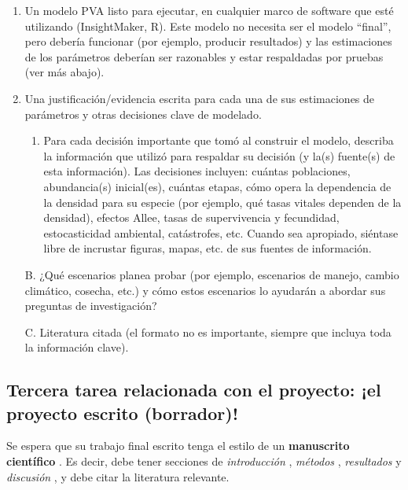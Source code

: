 \documentclass[
]{article}
\providecommand{\tightlist}{%
  \setlength{\itemsep}{0pt}\setlength{\parskip}{0pt}}
\begin{document}
\begin{enumerate}
\def\labelenumi{\arabic{enumi}.}
\item
  Un modelo PVA listo para ejecutar, en cualquier marco de software que
  esté utilizando (InsightMaker, R). Este modelo no necesita ser el
  modelo ``final'', pero debería funcionar (por ejemplo, producir
  resultados) y las estimaciones de los parámetros deberían ser
  razonables y estar respaldadas por pruebas (ver más abajo).
\item
  Una justificación/evidencia escrita para cada una de sus estimaciones
  de parámetros y otras decisiones clave de modelado.

  \begin{enumerate}
  \def\labelenumii{\Alph{enumii}.}
  \tightlist
  \item
    Para cada decisión importante que tomó al construir el modelo,
    describa la información que utilizó para respaldar su decisión (y
    la(s) fuente(s) de esta información). Las decisiones incluyen:
    cuántas poblaciones, abundancia(s) inicial(es), cuántas etapas, cómo
    opera la dependencia de la densidad para su especie (por ejemplo,
    qué tasas vitales dependen de la densidad), efectos Allee, tasas de
    supervivencia y fecundidad, estocasticidad ambiental, catástrofes,
    etc. Cuando sea apropiado, siéntase libre de incrustar figuras,
    mapas, etc. de sus fuentes de información.
  \end{enumerate}

  B. ¿Qué escenarios planea probar (por ejemplo, escenarios de manejo,
  cambio climático, cosecha, etc.) y cómo estos escenarios lo ayudarán a
  abordar sus preguntas de investigación?

  C. Literatura citada (el formato no es importante, siempre que incluya
  toda la información clave).
\end{enumerate}

\hypertarget{tercera-tarea-relacionada-con-el-proyecto-el-proyecto-escrito-borrador}{%
\subsection{Tercera tarea relacionada con el proyecto: ¡el proyecto
escrito
(borrador)!}\label{tercera-tarea-relacionada-con-el-proyecto-el-proyecto-escrito-borrador}}

Se espera que su trabajo final escrito tenga el estilo de un
\textbf{manuscrito científico }. Es decir, debe tener secciones de
\emph{introducción }, \emph{métodos }, \emph{resultados } y
\emph{discusión }, y debe citar la literatura relevante.
\end{document}
